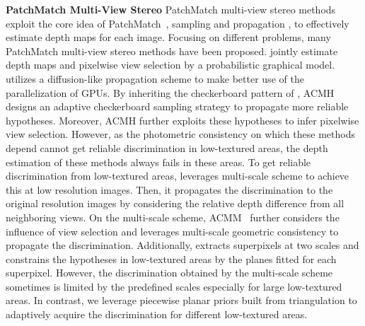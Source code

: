 \documentclass[letterpaper]{article} %
\begin{document}
\noindent\textbf{PatchMatch Multi-View Stereo} PatchMatch multi-view stereo methods exploit the core idea of PatchMatch~\cite{Barnes2009PatchMatch}, sampling and propagation , to effectively estimate depth maps for each image. Focusing on different problems, many PatchMatch multi-view stereo methods have been proposed. \cite{Zheng2014PatchMatch,Schonberger2016Pixelwise} jointly estimate depth maps and pixelwise view selection by a probabilistic graphical model. \cite{Galliani2015Massively} utilizes a diffusion-like propagation scheme to make better use of the parallelization of GPUs. By inheriting the checkerboard pattern of \cite{Galliani2015Massively}, ACMH~\cite{Xu2018Multi} designs an adaptive checkerboard sampling strategy to propagate more reliable hypotheses. Moreover, ACMH further exploits these hypotheses to infer pixelwise view selection. However, as the photometric consistency on which these methods depend cannot get reliable discrimination in low-textured areas, the depth estimation of these methods always fails in these areas. To get reliable discrimination from low-textured areas, \cite{Wei2014Multi} leverages multi-scale scheme to achieve this at low resolution images. Then, it propagates the discrimination to the original resolution images by considering the relative depth difference from all neighboring views. On the multi-scale scheme, ACMM~\cite{Xu2018Multi} further considers the influence of view selection and leverages multi-scale geometric consistency to propagate the discrimination. Additionally, \cite{Romanoni2019TAPA} extracts superpixels at two scales and constrains the hypotheses in low-textured areas by the planes fitted for each superpixel. However, the discrimination obtained by the multi-scale scheme sometimes is limited by the predefined scales especially for large low-textured areas. In contrast, we leverage piecewise planar priors built from triangulation to adaptively acquire the discrimination for different low-textured areas.
\end{document}
